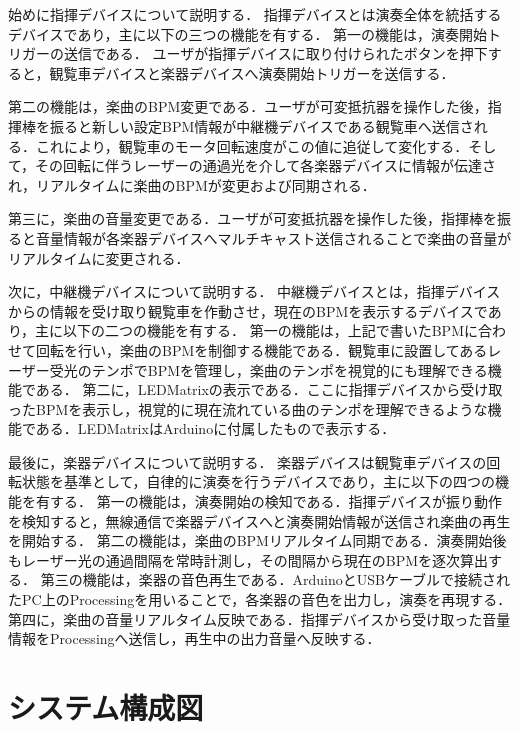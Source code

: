 \documentclass[lualatex,book,paper=a4paper,jafontsize=11.5pt,jafontscale=1.05]{jlreq}
\begin{document}
始めに指揮デバイスについて説明する．
指揮デバイスとは演奏全体を統括するデバイスであり，主に以下の三つの機能を有する．
第一の機能は，演奏開始トリガーの送信である．
ユーザが指揮デバイスに取り付けられたボタンを押下すると，観覧車デバイスと楽器デバイスへ演奏開始トリガーを送信する．


第二の機能は，楽曲のBPM変更である．ユーザが可変抵抗器を操作した後，指揮棒を振ると新しい設定BPM情報が中継機デバイスである観覧車へ送信される．これにより，観覧車のモータ回転速度がこの値に追従して変化する．そして，その回転に伴うレーザーの通過光を介して各楽器デバイスに情報が伝達され，リアルタイムに楽曲のBPMが変更および同期される．

第三に，楽曲の音量変更である．ユーザが可変抵抗器を操作した後，指揮棒を振ると音量情報が各楽器デバイスへマルチキャスト送信されることで楽曲の音量がリアルタイムに変更される．

次に，中継機デバイスについて説明する．
中継機デバイスとは，指揮デバイスからの情報を受け取り観覧車を作動させ，現在のBPMを表示するデバイスであり，主に以下の二つの機能を有する．
第一の機能は，上記で書いたBPMに合わせて回転を行い，楽曲のBPMを制御する機能である．観覧車に設置してあるレーザー受光のテンポでBPMを管理し，楽曲のテンポを視覚的にも理解できる機能である．
第二に，LEDMatrixの表示である．ここに指揮デバイスから受け取ったBPMを表示し，視覚的に現在流れている曲のテンポを理解できるような機能である．LEDMatrixはArduinoに付属したもので表示する．

最後に，楽器デバイスについて説明する．
楽器デバイスは観覧車デバイスの回転状態を基準として，自律的に演奏を行うデバイスであり，主に以下の四つの機能を有する．
第一の機能は，演奏開始の検知である．指揮デバイスが振り動作を検知すると，無線通信で楽器デバイスへと演奏開始情報が送信され楽曲の再生を開始する．
第二の機能は，楽曲のBPMリアルタイム同期である．演奏開始後もレーザー光の通過間隔を常時計測し，その間隔から現在のBPMを逐次算出する．
第三の機能は，楽器の音色再生である．ArduinoとUSBケーブルで接続されたPC上のProcessingを用いることで，各楽器の音色を出力し，演奏を再現する．
第四に，楽曲の音量リアルタイム反映である．指揮デバイスから受け取った音量情報をProcessingへ送信し，再生中の出力音量へ反映する．







\section{システム構成図}
\end{document}
